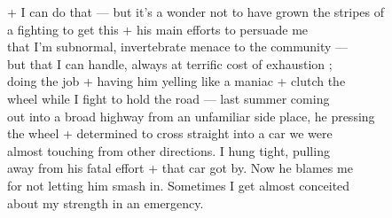 \documentclass[11pt,a4paper]{article}
\begin{document}
{+ I can do that --- but it's a wonder not to have grown the stripes of \\
a  fighting to get this + his main efforts to persuade me \\
that I'm subnormal, invertebrate menace to the community --- \\
but that I can handle, always at terrific cost of exhaustion ; \\
doing the job + having him yelling like a maniac + clutch the \\
wheel while I fight to hold the road --- last summer coming \\
out into a broad highway from an unfamiliar side place, he pressing \\
the wheel + determined to cross straight into a car we were \\
almost touching from other directions. I hung tight, pulling \\
away from his fatal effort + that car got by. Now he blames me \\
for not letting him smash in. Sometimes I get almost conceited \\
about my strength in an emergency.}




\end{document}
